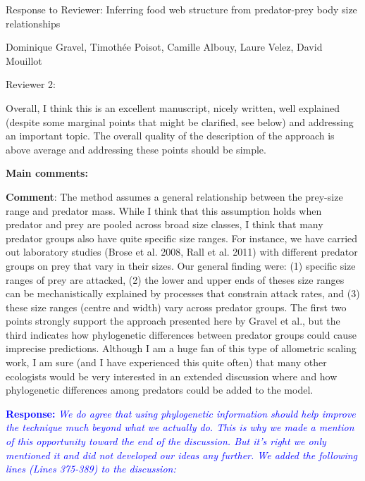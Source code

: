 \documentclass [12pt,onecolumn,twoside,openright]{report}
\begin{document}
 \begin{onehalfspacing} \begin{center} \LARGE{Response to
Reviewer: Inferring food web structure from predator-prey body size
relationships} \end{center}

\medskip

Dominique Gravel, Timoth\'ee Poisot, Camille Albouy, Laure Velez, David Mouillot

\medskip
\begin{center} \large{Reviewer 2: }\end{center}

Overall, I think this is an excellent manuscript, nicely written, well explained
(despite some marginal points that might be clarified, see below) and addressing
an important topic. The overall quality of the description of the approach is
above average and addressing these points should be simple.


\medskip \textbf{\large{Main comments:}}


\medskip \textbf{Comment}: The method assumes a general
relationship between the prey-size range and predator mass. While I think that
this assumption holds when predator and prey are pooled across broad size
classes, I think that many predator groups also have quite specific size ranges.
For instance, we have carried out laboratory studies (Brose et al. 2008, Rall et
al. 2011) with different predator groups on prey that vary in their sizes. Our
general finding were: (1) specific size ranges of prey are attacked, (2) the
lower and upper ends of theses size ranges can be mechanistically explained by
processes that constrain attack rates, and (3) these size ranges (centre and
width) vary across predator groups. The first two points strongly support the
approach presented here by Gravel et al., but the third indicates how
phylogenetic differences between predator groups could cause imprecise
predictions. Although I am a huge fan of this type of allometric scaling work, I
am sure (and I have experienced this quite often) that many other ecologists
would be very interested in an extended discussion where and how phylogenetic
differences among predators could be added to the model.

\medskip \textcolor{blue}{\textbf{Response:}} \textit{\textcolor{blue}{We do agree that using phylogenetic information should help improve the technique much beyond what we actually do. This is why we made a mention of this opportunity toward the end of the discussion. But it's right we only mentioned it and did not developed our ideas any further. We added the following lines (Lines 375-389) to the discussion:}}  


\end{onehalfspacing}
\end{document}
